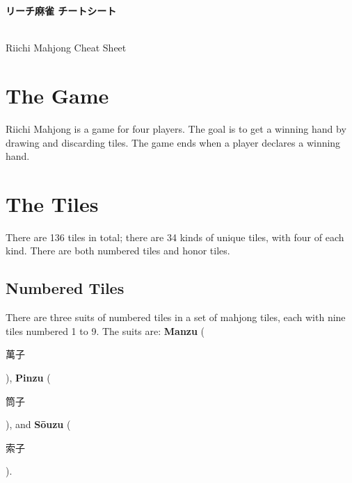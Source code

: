 \documentclass[12pt,landscape]{article}
\begin{document}
\begin{multicols*}{2}

    \begin{center}
        \begin{CJK}{UTF8}{min}
            \Large\textbf{リーチ麻雀 チートシート}
        \end{CJK}\\
        \small{Riichi Mahjong Cheat Sheet}
    \end{center}

    \section{The Game}
    Riichi Mahjong is a game for four players. 
    The goal is to get a winning hand by drawing and discarding tiles.
    The game ends when a player declares a winning hand.

    \section{The Tiles}
    There are 136 tiles in total; there are 34 kinds of unique tiles, with four of each kind.
    There are both numbered tiles and honor tiles.
    
    \subsection{Numbered Tiles}
    There are three suits of numbered tiles in a set of mahjong tiles, each with nine tiles numbered 1 to 9.
    The suits are: \textbf{Manzu} (\begin{CJK}{UTF8}{min}萬子\end{CJK}), 
    \textbf{Pinzu} (\begin{CJK}{UTF8}{min}筒子\end{CJK}), 
    and \textbf{Sōuzu} (\begin{CJK}{UTF8}{min}索子\end{CJK}).\\


\end{multicols*}
\end{document}

